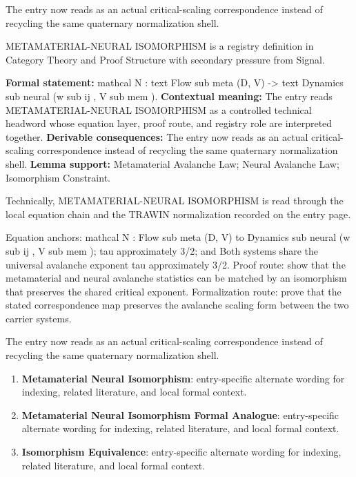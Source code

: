 The entry now reads as an actual critical-scaling correspondence instead of recycling the same quaternary normalization shell.
\clearpage


\begingroup\small
{}
METAMATERIAL-NEURAL ISOMORPHISM is a registry definition in Category Theory and Proof Structure with secondary pressure from Signal.

\begingroup\footnotesize\setlength{\emergencystretch}{3em}\sloppy
\textbf{Formal statement:} mathcal N : text Flow sub meta (D, V) -> text Dynamics sub neural (w sub ij , V sub mem ). \textbf{Contextual meaning:} The entry reads METAMATERIAL-NEURAL ISOMORPHISM as a controlled technical headword whose equation layer, proof route, and registry role are interpreted together. \textbf{Derivable consequences:} The entry now reads as an actual critical-scaling correspondence instead of recycling the same quaternary normalization shell. \textbf{Lemma support:} Metamaterial Avalanche Law; Neural Avalanche Law; Isomorphism Constraint.\par
\endgroup

Technically, METAMATERIAL-NEURAL ISOMORPHISM is read through the local equation chain and the TRAWIN normalization recorded on the entry page.

Equation anchors: mathcal N : Flow sub meta (D, V) to Dynamics sub neural (w sub ij , V sub mem ); tau approximately 3/2; and Both systems share the universal avalanche exponent tau approximately 3/2. Proof route: show that the metamaterial and neural avalanche statistics can be matched by an isomorphism that preserves the shared critical exponent. Formalization route: prove that the stated correspondence map preserves the avalanche scaling form between the two carrier systems.

The entry now reads as an actual critical-scaling correspondence instead of recycling the same quaternary normalization shell.
\endgroup

\begin{enumerate}[leftmargin=1.6em,itemsep=6pt,topsep=4pt]
\item \textbf{Metamaterial Neural Isomorphism}: entry-specific alternate wording for indexing, related literature, and local formal context.
\item \textbf{Metamaterial Neural Isomorphism Formal Analogue}: entry-specific alternate wording for indexing, related literature, and local formal context.
\item \textbf{Isomorphism Equivalence}: entry-specific alternate wording for indexing, related literature, and local formal context.
\end{enumerate}

